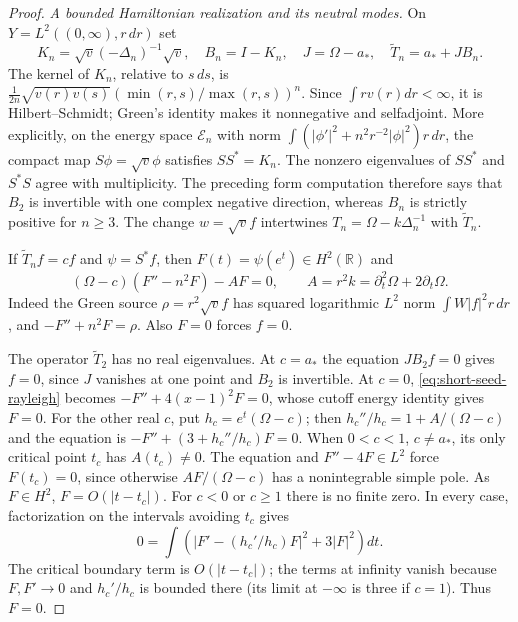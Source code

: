 \begin{proof}
\emph{A bounded Hamiltonian realization and its neutral modes.}
On $Y=L^2((0,\infty),r\,dr)$ set
\[
 K_n=\sqrt v(-\Delta_n)^{-1}\sqrt v,\quad B_n=I-K_n,
 \quad J=\Omega-a_*,\quad \widetilde T_n=a_*+JB_n.
\]
The kernel of $K_n$, relative to $s\,ds$, is
$\frac1{2n}\sqrt{v(r)v(s)}(\min(r,s)/\max(r,s))^n$.
Since $\int rv(r)dr<\infty$, it is Hilbert--Schmidt; Green's identity
makes it nonnegative and selfadjoint. More explicitly, on the energy
space $\mathcal E_n$ with norm
$\int(|\phi'|^2+n^2r^{-2}|\phi|^2)r\,dr$, the compact map
$S\phi=\sqrt v\phi$ satisfies $SS^*=K_n$.
The nonzero eigenvalues of $SS^*$ and $S^*S$ agree with multiplicity.
The preceding form computation therefore says that $B_2$ is invertible
with one complex negative direction, whereas $B_n$ is strictly positive
for $n\ge3$. The change $w=\sqrt v f$ intertwines
$T_n=\Omega-k\Delta_n^{-1}$ with $\widetilde T_n$.

If $\widetilde T_nf=cf$ and $\psi=S^*f$, then
$F(t)=\psi(e^t)\in H^2(\mathbb R)$ and
\begin{equation}\label{eq:short-seed-rayleigh}
 (\Omega-c)(F''-n^2F)-AF=0,\qquad
 A=r^2k=\partial_t^2\Omega+2\partial_t\Omega.
\end{equation}
Indeed the Green source $\rho=r^2\sqrt v f$ has squared logarithmic
$L^2$ norm $\int W|f|^2r\,dr$, and
$-F''+n^2F=\rho$. Also $F=0$ forces $f=0$.

The operator $\widetilde T_2$ has no real eigenvalues. At $c=a_*$ the equation
$JB_2f=0$ gives $f=0$, since $J$ vanishes at one point and $B_2$ is
invertible. At $c=0$, \eqref{eq:short-seed-rayleigh} becomes
$-F''+4(x-1)^2F=0$, whose cutoff energy identity gives $F=0$.
For the other real $c$, put $h_c=e^t(\Omega-c)$; then
$h_c''/h_c=1+A/(\Omega-c)$ and the equation is
$-F''+(3+h_c''/h_c)F=0$.
When $0<c<1$, $c\ne a_*$, its only critical point $t_c$ has
$A(t_c)\ne0$. The equation and $F''-4F\in L^2$ force
$F(t_c)=0$, since otherwise $AF/(\Omega-c)$ has a nonintegrable
simple pole. As $F\in H^2$, $F=O(|t-t_c|)$.
For $c<0$ or $c\ge1$ there is no finite zero. In every case,
factorization on the intervals avoiding $t_c$ gives
\[
 0=\int\left(|F'-(h_c'/h_c)F|^2+3|F|^2\right)dt.
\]
The critical boundary term is $O(|t-t_c|)$; the terms at infinity
vanish because $F,F'\to0$ and $h_c'/h_c$ is bounded there
(its limit at $-\infty$ is three if $c=1$). Thus $F=0$.


\end{proof}
